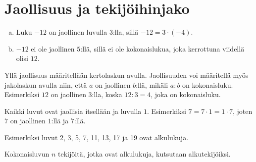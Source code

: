 
    \section{Jaollisuus ja tekijöihinjako}

   
    
    \begin{esimerkki}
    \begin{enumerate}[a)]
    \item Luku $-12$ on jaollinen luvulla $3$:lla, sillä $-12 = 3 \cdot (-4)$.
    \item $-12$ ei ole jaollinen $5$:llä, sillä ei ole kokonaislukua, joka kerrottuna viidellä olisi $12$.
    \end{enumerate}
    \end{esimerkki}
    
    
    Yllä jaollisuus määritellään kertolaskun avulla. Jaollisuuden voi määritellä myös jakolaskun avulla niin, että $a$ on jaollinen $b$:llä, mikäli $a:b$ on kokonaisluku. Esimerkiksi $12$ on jaollinen $3$:lla, koska $12:3 = 4$, joka on kokonaisluku.
   
    
    Kaikki luvut ovat jaollisia itsellään ja luvulla $1$. Esimerkiksi $7=7 \cdot 1=1 \cdot 7$, joten $7$ on jaollinen $1$:llä ja $7$:llä.
    
    
    Esimerkiksi luvut 2, 3, 5, 7, 11, 13, 17 ja 19 ovat alkulukuja.
    
    Kokonaisluvun $n$ tekijöitä, jotka ovat alkulukuja, kutsutaan alkutekijöiksi.
    
    
